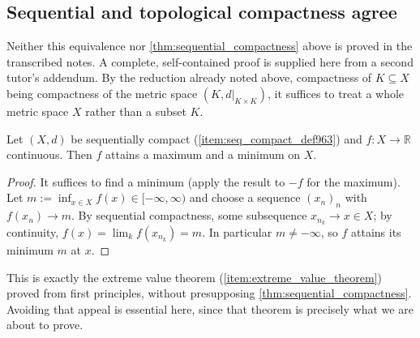 
\subsection{Sequential and topological compactness agree}

\begin{ainote}
Neither this equivalence nor \cref{thm:sequential_compactness} above is proved in the
transcribed notes. A complete, self-contained proof is supplied here
from a second tutor's addendum. By the reduction already noted above, compactness of
$K \subseteq X$ being compactness of the metric space $(K,d|_{K\times K})$, it suffices to treat a
whole metric space $X$ rather than a subset $K$.
\end{ainote}

\begin{lemma}
\label{lem:sequential_compactness_extreme_values}
Let $(X,d)$ be sequentially compact (\cref{item:seq_compact_def963}) and $f : X \to \mathbb{R}$
continuous. Then $f$ attains a maximum and a minimum on $X$.
\end{lemma}

\begin{proof}
It suffices to find a minimum (apply the result to $-f$ for the maximum). Let
$m := \inf_{x\in X} f(x) \in [-\infty,\infty)$ and choose a sequence $(x_n)_{n}$ with
$f(x_n) \to m$. By sequential compactness, some subsequence $x_{n_k} \to x \in X$; by continuity,
$f(x) = \lim_k f(x_{n_k}) = m$. In particular $m \neq -\infty$, so $f$ attains its minimum $m$ at
$x$.
\end{proof}

\begin{remark}
This is exactly the extreme value theorem (\cref{item:extreme_value_theorem}) proved from first
principles, without presupposing \cref{thm:sequential_compactness}. Avoiding that appeal is
essential here, since that theorem is precisely what we are about to prove.
\end{remark}

